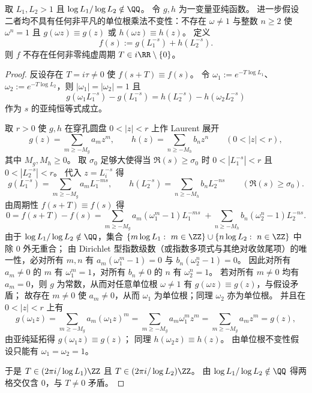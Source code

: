 \begin{theorem}\label{thm:xi-two-base-deperiodization-no-imag-period}
取 \(L_1,L_2>1\) 且 \(\log L_1/\log L_2\notin\QQ\)。
令 \(g,h\) 为一变量亚纯函数。
进一步假设二者均不具有任何非平凡的单位根乘法不变性：不存在 \(\omega\neq 1\) 与整数 \(n\ge 2\) 使 \(\omega^n=1\) 且 \(g(\omega z)\equiv g(z)\) 或 \(h(\omega z)\equiv h(z)\)。
定义
\[
f(s):=g(L_1^{-s})+h(L_2^{-s}).
\]
则 \(f\) 不存在任何非零纯虚周期 \(T\in i\RR\setminus\{0\}\)。
\end{theorem}

\begin{proof}
反设存在 \(T=i\tau\neq 0\) 使 \(f(s+T)\equiv f(s)\)。
令 \(\omega_1:=e^{-T\log L_1}\)、\(\omega_2:=e^{-T\log L_2}\)，则 \(|\omega_1|=|\omega_2|=1\) 且
\[
g(\omega_1 L_1^{-s})-g(L_1^{-s})=h(L_2^{-s})-h(\omega_2 L_2^{-s})
\]
作为 \(s\) 的亚纯恒等式成立。
\par
取 \(r>0\) 使 \(g,h\) 在穿孔圆盘 \(0<|z|<r\) 上作 Laurent 展开
\[
g(z)=\sum_{m\ge -M_g} a_m z^m,\qquad
h(z)=\sum_{n\ge -M_h} b_n z^n
\qquad(0<|z|<r),
\]
其中 \(M_g,M_h\ge 0\)。
取 \(\sigma_0\) 足够大使得当 \(\Re(s)\ge \sigma_0\) 时 \(0<|L_1^{-s}|<r\) 且 \(0<|L_2^{-s}|<r\)。
代入 \(z=L_i^{-s}\) 得
\[
g(L_1^{-s})=\sum_{m\ge -M_g} a_m L_1^{-ms},\qquad
h(L_2^{-s})=\sum_{n\ge -M_h} b_n L_2^{-ns}
\qquad(\Re(s)\ge \sigma_0).
\]
由周期性 \(f(s+T)\equiv f(s)\) 得
\[
0=f(s+T)-f(s)
=\sum_{m\ge -M_g} a_m(\omega_1^m-1)L_1^{-ms}
\;+\sum_{n\ge -M_h} b_n(\omega_2^n-1)L_2^{-ns}.
\]
由于 \(\log L_1/\log L_2\notin\QQ\)，集合 \(\{m\log L_1:\ m\in\ZZ\}\cup\{n\log L_2:\ n\in\ZZ\}\) 中除 \(0\) 外无重合；
由 Dirichlet 型指数级数（或指数多项式与其绝对收敛尾项）的唯一性，必对所有 \(m,n\) 有
\(
a_m(\omega_1^m-1)=0
\) 与
\(
b_n(\omega_2^n-1)=0
\)。
因此对所有 \(a_m\neq 0\) 的 \(m\) 有 \(\omega_1^m=1\)，对所有 \(b_n\neq 0\) 的 \(n\) 有 \(\omega_2^n=1\)。
若对所有 \(m\neq 0\) 均有 \(a_m=0\)，则 \(g\) 为常数，从而对任意单位根 \(\omega\neq 1\) 有 \(g(\omega z)\equiv g(z)\)，与假设矛盾；
故存在 \(m\neq 0\) 使 \(a_m\neq 0\)，从而 \(\omega_1\) 为单位根；同理 \(\omega_2\) 亦为单位根。
并且在 \(0<|z|<r\) 上有
\[
g(\omega_1 z)
=\sum_{m\ge -M_g} a_m(\omega_1 z)^m
=\sum_{m\ge -M_g} a_m\omega_1^m z^m
=\sum_{m\ge -M_g} a_m z^m
=g(z),
\]
由亚纯延拓得 \(g(\omega_1 z)\equiv g(z)\)；
同理 \(h(\omega_2 z)\equiv h(z)\)。
由单位根不变性假设只能有 \(\omega_1=\omega_2=1\)。
\par
于是 \(T\in (2\pi i/\log L_1)\ZZ\) 且 \(T\in (2\pi i/\log L_2)\ZZ\)。
由 \(\log L_1/\log L_2\notin\QQ\) 得两格交仅含 \(0\)，与 \(T\neq 0\) 矛盾。
\end{proof}
